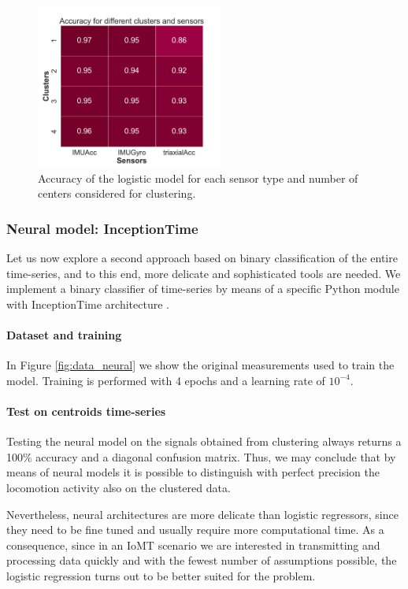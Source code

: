 \documentclass[10pt, a4paper, twocolumn]{article}
\theoremstyle{definition}
\begin{document}
\begin{figure} [h]
         \includegraphics[width=0.55\textwidth]{../clustering/clustering_results_euclidean/accuracy_clusters.pdf}
    \caption{Accuracy of the logistic model for each sensor type and number of centers considered for clustering.  }\label{fig:logistic_clusters}
\end{figure}


\subsubsection{Neural model: InceptionTime }
Let us now explore a second approach based on binary classification of the entire time-series, and to this end, more delicate and sophisticated tools are needed. We implement a binary classifier of time-series by means of a specific Python module \cite{tsai} with InceptionTime architecture \cite{Ismail_Fawaz_2020}.
\paragraph{Dataset and training} In Figure \ref{fig:data_neural} we show the original measurements used to train the model. Training is performed with 4 epochs and a learning rate of $10^{-4}$.

\paragraph{Test on centroids time-series} Testing the neural model on the signals obtained from clustering always returns a 100\% accuracy and a diagonal confusion matrix. Thus, we may conclude that by means of neural models it is possible to distinguish with perfect precision the locomotion activity also on the clustered data. \par
Nevertheless, neural architectures are more delicate than logistic regressors, since they need to be fine tuned and usually require more computational time. As a consequence, since in an IoMT scenario we are interested in transmitting and processing data quickly and with the fewest number of assumptions possible, the logistic regression turns out to be better suited for the problem.
\end{document}
